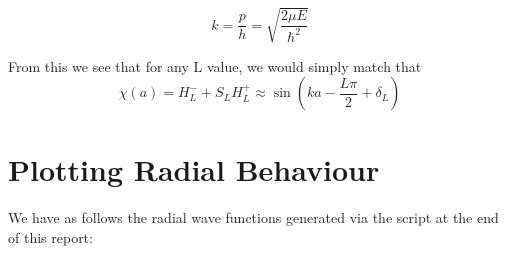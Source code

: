 \documentclass[11pt]{article} %
\begin{document}
\begin{equation}
k=\frac{p}{h}=\sqrt{\frac{2\mu E}{\hbar^2}}
\end{equation}

From this we see that for any L value, we would simply match that\\

\begin{equation}
\chi(a)=H_L^-+S_LH_L^+\approx \sin(ka-\frac{L\pi}{2}+\delta_L)
\end{equation}
\newpage
\section{Plotting Radial Behaviour}
We have as follows the radial wave functions generated via the script at the end of this report:\\

\begin{figure}[htbp]
\centering
\begin{floatrow}
\quad

\centering
{}
\end{floatrow}
\end{figure}
\vspace{1mm}
\end{document}
